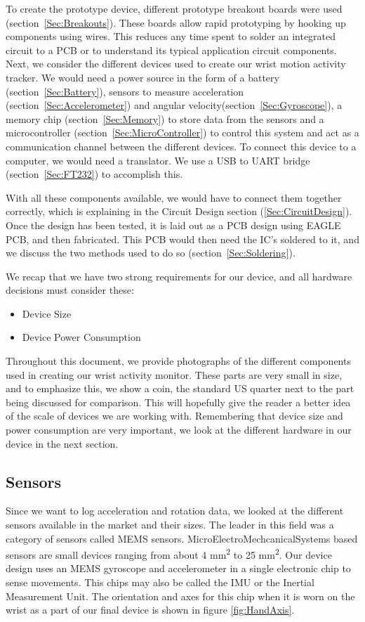 To create the prototype device, different prototype breakout boards were used (section~\ref{Sec:Breakouts}). These boards allow rapid prototyping by hooking up components using wires. This reduces any time spent to solder an integrated circuit to a PCB or to understand its typical application circuit components. Next, we consider the different devices used to create our wrist motion activity tracker. We would need a power source in the form of a battery (section~\ref{Sec:Battery}), sensors to measure acceleration (section~\ref{Sec:Accelerometer}) and angular velocity(section~\ref{Sec:Gyroscope}), a memory chip (section~\ref{Sec:Memory}) to store data from the sensors and a microcontroller (section~\ref{Sec:MicroController}) to control this system and act as a communication channel between the different devices. To connect this device to a computer, we would need a translator. We use a USB to UART bridge (section~\ref{Sec:FT232}) to accomplish this.

With all these components available, we would have to connect them together correctly, which is explaining in the Circuit Design section (\ref{Sec:CircuitDesign}). Once the design has been tested, it is laid out as a PCB design using EAGLE PCB, and then fabricated. This PCB would then need the IC's soldered to it, and we discuss the two methods used to do so (section~\ref{Sec:Soldering}).

We recap that we have two strong requirements for our device, and all hardware decisions must consider these:
\begin{itemize}
  \item Device Size
  \item Device Power Consumption
\end{itemize}

Throughout this document,
we provide photographs of the different components used in creating our wrist activity monitor.
These parts are very small in size,
and to emphasize this,
we show a coin,
the standard US quarter next to the part being discussed for comparison.
This will hopefully give the reader a better idea of the scale of devices we are working with.
Remembering that device size and power consumption are very important,
we look at the different hardware in our device in the next section.

\subsection{Sensors}
Since we want to log acceleration and rotation data, we looked at the different sensors available in the market and their sizes. The leader in this field was a category of sensors called MEMS sensors. MicroElectroMechcanicalSystems based sensors are small devices ranging from about 4 mm\textsuperscript{2} to  25 mm\textsuperscript{2}. Our device design uses an MEMS gyroscope and accelerometer in a single electronic chip to sense movements. This chips may also be called the IMU or the Inertial Measurement Unit. The orientation and axes for this chip when it is worn on the wrist as a part of our final device is shown in figure \ref{fig:HandAxis}.

